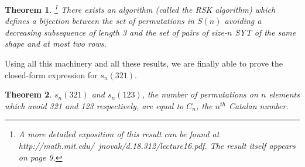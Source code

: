 \documentclass[11pt,letterpaper,twoside,english]{article}
\theoremstyle{theorem}
\newtheorem{theorem}{Theorem}[section]
\theoremstyle{remark}
\begin{document}
\begin{theorem}\footnote{A more detailed exposition of this result can be found at http://math.mit.edu/~jnovak/d.18.312/lecture16.pdf. The result itself appears on page 9.}
\label{rsk}
There exists an algorithm (called the \emph{RSK algorithm}) which defines a bijection between the set of permutations in $S(n)$ avoiding a decreasing subsequence of length 3 and the set of pairs of size-$n$ SYT of the same shape and at most two rows. 
\end{theorem}
Using all this machinery and all these results, we are finally able to prove the closed-form expression for $s_n(321)$.
\begin{theorem}
$s_n(321)$ and $s_n(123)$, the number of permutations on $n$ elements which avoid 321 and 123 respectively, are equal to $C_n$, the $n^{th}$ Catalan number.
\end{theorem}
\end{document}
